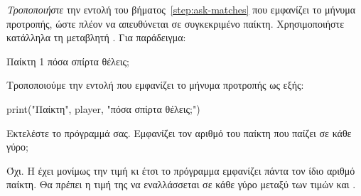 \documentclass[a4paper,11pt,oneside]{book}
\begin{document}
\begin{step}
\label{step:ask-matches-player}
\emph{Τροποποιήστε} την εντολή του βήματος~\ref{step:ask-matches} που εμφανίζει το μήνυμα προτροπής, ώστε πλέον να απευθύνεται σε συγκεκριμένο παίκτη. Χρησιμοποιήστε κατάλληλα τη μεταβλητή . Για παράδειγμα:

\clearpage
\marginnote[14pt]{\iconcomputer}
\begin{pyterm}
Παίκτη 1 πόσα σπίρτα θέλεις;
\end{pyterm}

\begin{answer}
Τροποποιούμε την εντολή που εμφανίζει το μήνυμα προτροπής ως εξής:

\begin{pynew}
    print("Παίκτη", player, "πόσα σπίρτα θέλεις;")
\end{pynew}
\end{answer}

Εκτελέστε το πρόγραμμά σας. Εμφανίζει τον αριθμό του παίκτη που παίζει σε κάθε γύρο; 

\begin{answer}
Όχι. Η  έχει μονίμως την τιμή  κι έτσι το πρόγραμμα εμφανίζει πάντα τον ίδιο αριθμό παίκτη. Θα πρέπει η τιμή της  να εναλλάσσεται σε κάθε γύρο μεταξύ των τιμών  και .
\end{answer}
\end{step}
\end{document}
